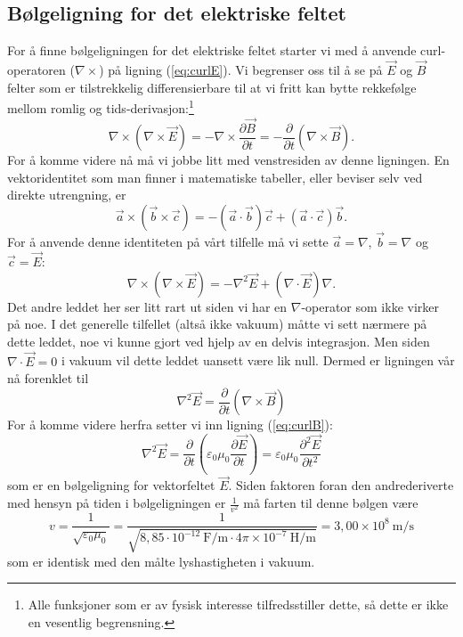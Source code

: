 \documentclass[a4paper,norsk,12pt]{article}
\begin{document}
\subsection*{Bølgeligning for det elektriske feltet}
For å finne bølgeligningen for det elektriske feltet starter vi med å anvende curl-operatoren ($\nabla\times$) på ligning (\ref{eq:curlE}). Vi begrenser oss til å se på $\vec{E}$ og $\vec{B}$ felter som er tilstrekkelig differensierbare til at vi fritt kan bytte rekkefølge mellom romlig og tids-derivasjon:\footnote{Alle funksjoner som er av fysisk interesse tilfredsstiller dette, så dette er ikke en vesentlig begrensning.}
\begin{displaymath}
	\nabla\times(\nabla\times\vec{E}) = -\nabla\times\frac{\partial\vec{B}}{\partial t} = -\frac{\partial}{\partial t}(\nabla\times\vec{B}).
\end{displaymath}
For å komme videre nå må vi jobbe litt med venstresiden av denne ligningen. En vektoridentitet som man finner i matematiske tabeller, eller beviser selv ved direkte utrengning, er
\begin{displaymath}
	\vec{a}\times(\vec{b}\times\vec{c}) = -(\vec{a}\cdot\vec{b})\vec{c} + (\vec{a}\cdot\vec{c})\vec{b}.
\end{displaymath}
For å anvende denne identiteten på vårt tilfelle må vi sette $\vec{a} = \nabla$, $\vec{b}=\nabla$ og $\vec{c}=\vec{E}$:
\begin{displaymath}
	\nabla\times(\nabla\times\vec{E}) = -\nabla^2\vec{E}+(\nabla\cdot\vec{E})\nabla.
\end{displaymath}
Det andre leddet her ser litt rart ut siden vi har en $\nabla$-operator som ikke virker på noe. I det generelle tilfellet (altså ikke vakuum) måtte vi sett nærmere på dette leddet, noe vi kunne gjort ved hjelp av en delvis integrasjon. Men siden $\nabla\cdot\vec{E}=0$ i vakuum vil dette leddet uansett være lik null. Dermed er ligningen vår nå forenklet til
\begin{displaymath}
	\nabla^2\vec{E} = \frac{\partial}{\partial t}(\nabla\times\vec{B})
\end{displaymath}
For å komme videre herfra setter vi inn ligning (\ref{eq:curlB}):
\begin{displaymath} 
	\nabla^2\vec{E} = \frac{\partial}{\partial t}\left(\varepsilon_0\mu_0\frac{\partial \vec{E}}{\partial t}\right) = \varepsilon_0\mu_0\frac{\partial^2\vec{E}}{\partial t^2}
\end{displaymath}
som er en bølgeligning for vektorfeltet $\vec{E}$. Siden faktoren foran den andrederiverte med hensyn på tiden i bølgeligningen er $\frac{1}{v^2}$ må farten til denne bølgen være
\begin{displaymath}
	v = \frac{1}{\sqrt{\varepsilon_0\mu_0}} = \frac{1}{\sqrt{8,85\cdot10^{-12}~\mathrm{F/m}\cdot 4\pi\times10^{-7}~\mathrm{H/m}}} = 3,00\times10^8~\mathrm{m/s}
\end{displaymath}
som er identisk med den målte lyshastigheten i vakuum.
\end{document}
